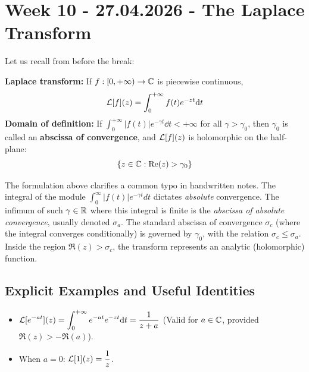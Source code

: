 \section{Week 10 - 27.04.2026 - The Laplace Transform}

\begin{recall}
Let us recall from before the break:

\textbf{Laplace transform:} If $f:[0,+\infty)\rightarrow \mathbb{C}$ is piecewise continuous,
\[
\mathcal{L}[f](z) = \int_{0}^{+\infty} f(t) e^{-zt} \mathrm{d} t
\]
\textbf{Domain of definition:} If $\int_{0}^{+\infty} |f(t)| e^{-\gamma t} \dd t < +\infty$ for all $\gamma > \gamma_0$, then $\gamma_0$ is called an \textbf{abscissa of convergence}, and $\mathcal{L}[f](z)$ is holomorphic on the half-plane:
\[
\{z \in \mathbb{C} : \operatorname{Re}(z) > \gamma_0\}
\]
\end{recall}

\begin{verification}
The formulation above clarifies a common typo in handwritten notes. The integral of the module $\int_0^\infty |f(t)| e^{-\gamma t} dt$ dictates \textit{absolute} convergence. The infimum of such $\gamma \in \mathbb{R}$ where this integral is finite is the \textit{abscissa of absolute convergence}, usually denoted $\sigma_a$. The standard abscissa of convergence $\sigma_c$ (where the integral converges conditionally) is governed by $\gamma_0$, with the relation $\sigma_c \le \sigma_a$. Inside the region $\Re(z) > \sigma_c$, the transform represents an analytic (holomorphic) function.
\end{verification}

\subsection{Explicit Examples and Useful Identities}

\begin{example}
\begin{itemize}
    \item $\displaystyle \mathcal{L}[e^{-at}](z) = \int_{0}^{+\infty} e^{-at} e^{-zt} \mathrm{d} t = \frac{1}{z+a}$ \quad (Valid for $a \in \mathbb{C}$, provided $\Re(z) > -\Re(a)$).
    \item When $a = 0$: $\displaystyle \mathcal{L}[1](z) = \frac{1}{z}$.
\end{itemize}
\end{example}

